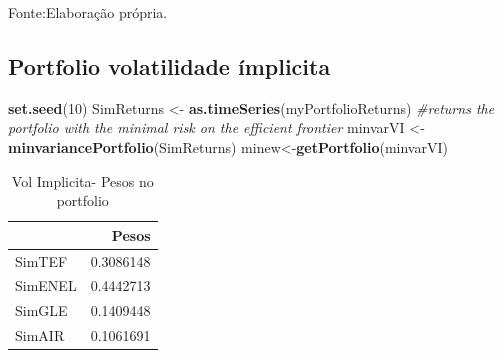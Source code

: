\documentclass[
  12pt,
  a4paper,
  openany]{book}
\newenvironment{Shaded}{\begin{snugshade}}{\end{snugshade}}
\newcommand{\CommentTok}[1]{\textcolor[rgb]{0.56,0.35,0.01}{\textit{#1}}}
\newcommand{\DataTypeTok}[1]{\textcolor[rgb]{0.13,0.29,0.53}{#1}}
\newcommand{\DecValTok}[1]{\textcolor[rgb]{0.00,0.00,0.81}{#1}}
\newcommand{\FloatTok}[1]{\textcolor[rgb]{0.00,0.00,0.81}{#1}}
\newcommand{\KeywordTok}[1]{\textcolor[rgb]{0.13,0.29,0.53}{\textbf{#1}}}
\newcommand{\NormalTok}[1]{#1}
\newcommand{\OperatorTok}[1]{\textcolor[rgb]{0.81,0.36,0.00}{\textbf{#1}}}
\newcommand{\StringTok}[1]{\textcolor[rgb]{0.31,0.60,0.02}{#1}}
\begin{document}
Fonte:Elaboração própria.

\justifying
\bigskip

\hypertarget{portfolio-volatilidade-uxedmplicita}{%
\subsection{Portfolio volatilidade ímplicita}\label{portfolio-volatilidade-uxedmplicita}}

\scriptsize

\begin{Shaded}
\begin{Highlighting}[]
\KeywordTok{set.seed}\NormalTok{(}\DecValTok{10}\NormalTok{)}
\NormalTok{SimReturns \textless{}{-}}\StringTok{ }\KeywordTok{as.timeSeries}\NormalTok{(myPortfolioReturns)}
\CommentTok{\#returns the portfolio with the minimal risk on the efficient frontier}
\NormalTok{minvarVI \textless{}{-}}\StringTok{ }\KeywordTok{minvariancePortfolio}\NormalTok{(SimReturns) }
\NormalTok{minew\textless{}{-}}\KeywordTok{getPortfolio}\NormalTok{(minvarVI)}
\end{Highlighting}
\end{Shaded}

\normalsize

\begin{table}[!h]

\caption{\label{tab:unnamed-chunk-65}Vol Implicita- Pesos no portfolio}
\centering
\begin{tabular}[t]{lr}
\toprule
  & Pesos\\
\midrule
SimTEF & 0.3086148\\
SimENEL & 0.4442713\\
SimGLE & 0.1409448\\
SimAIR & 0.1061691\\
\bottomrule
\end{tabular}
\end{table}

\scriptsize

\begin{Shaded}
\end{Shaded}
\end{document}
